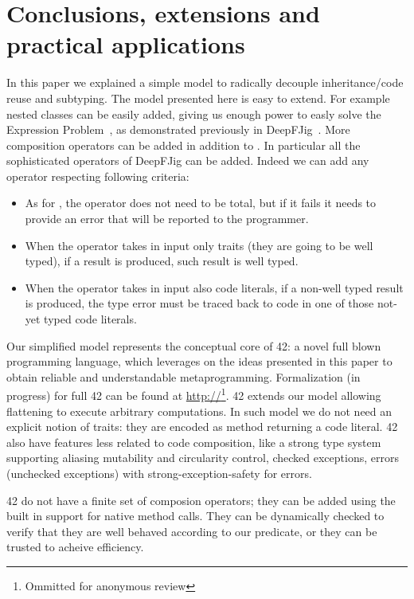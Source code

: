 \section{Conclusions, extensions and practical applications}

In this paper we explained a simple model to 
radically decouple inheritance/code reuse and subtyping.
The model presented here is easy to extend.
For example nested classes can be easily added, giving us enough power
to easly solve the Expression Problem~\cite{EP}, as demonstrated previously in
DeepFJig~\cite{deep}. More composition operators can be added in addition to \use.
In particular all the sophisticated operators of DeepFJig can be added.
 Indeed we can add any operator respecting following criteria:

\begin{itemize}
\item As for \use, the operator does not need to be total, but if it fails it needs to provide an error that will be reported to the programmer.
\item When the operator takes in input only traits (they are going to be well typed), if a result is produced,
 such result is well typed.
\item When the operator takes in input also code literals, if a non-well typed result is produced,
the type error must be traced back to code in one of those not-yet typed code literals.
 \end{itemize}
 

 
 Our simplified model represents the conceptual core of  42: a novel full blown programming language,
which leverages on the ideas presented in this paper to obtain reliable and understandable metaprogramming.
Formalization (in progress) for full 42 can be found at
\url{http://}\footnote{Ommitted for anonymous review}. 
42 extends our model allowing
flattening to execute arbitrary computations.
In such model we do not need an explicit notion of traits: they are encoded as method returning a code literal.
42 also have features less related to code composition, like
  a strong type system supporting aliasing mutability and circularity control,
   checked exceptions, errors (unchecked exceptions) with strong-exception-safety for errors.

42 do not have a finite set of composion operators; they can be
added using the built in support for native method calls. They can
be dynamically checked to verify that they are well behaved
according to our predicate, or they can be trusted to acheive
efficiency.


